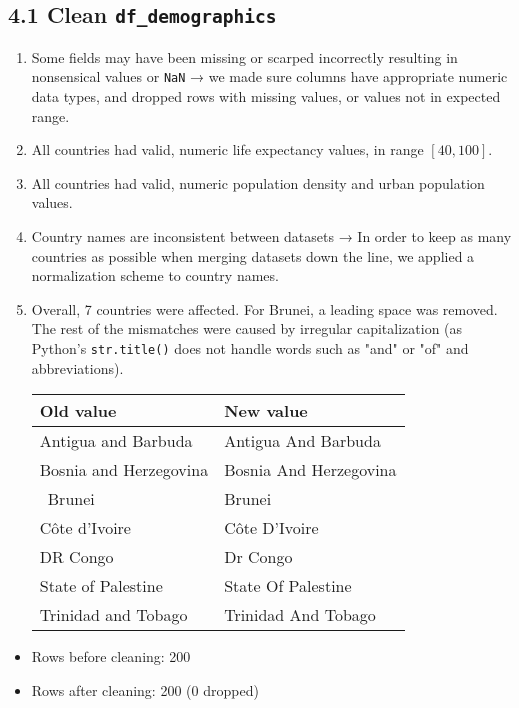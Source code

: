 \documentclass[14pt]{extarticle}
\begin{document}
\subsection*{4.1 Clean \texttt{df\_demographics}}
\begin{enumerate}[label=(\alph*)]
  \item Some fields may have been missing or scarped incorrectly resulting in
    nonsensical values or \texttt{NaN} → we made sure columns have appropriate numeric data types,
    and dropped rows with missing values, or values not in expected range.
  \item All countries had valid, numeric life expectancy values, in range $[40,100]$.
  \item All countries had valid, numeric population density and urban population values.
  \item Country names are inconsistent between datasets →
    In order to keep as many countries as possible when merging datasets down the line,
    we applied a normalization scheme to country names.
  \setcounter{enumi}{5}
  \item Overall, 7 countries were affected. For Brunei, a leading space was removed.
    The rest of the mismatches were caused by irregular capitalization
    (as Python's \texttt{str.title()} does not handle words such as "and" or "of" and abbreviations).
  \begin{center}
    \begin{tabular}{ |l|l| }
      \hline
      Old value&New value\\
      \hline
      Antigua and Barbuda&Antigua And Barbuda\\
      Bosnia and Herzegovina&Bosnia And Herzegovina\\
      \ Brunei&Brunei\\
      Côte d'Ivoire&Côte D'Ivoire\\
      DR Congo&Dr Congo\\
      State of Palestine&State Of Palestine\\
      Trinidad and Tobago&Trinidad And Tobago\\
      \hline
    \end{tabular}
  \end{center}
\end{enumerate}
\begin{itemize}
  \item Rows before cleaning: 200
  \item Rows after cleaning: 200 (0 dropped)
\end{itemize}
\end{document}
